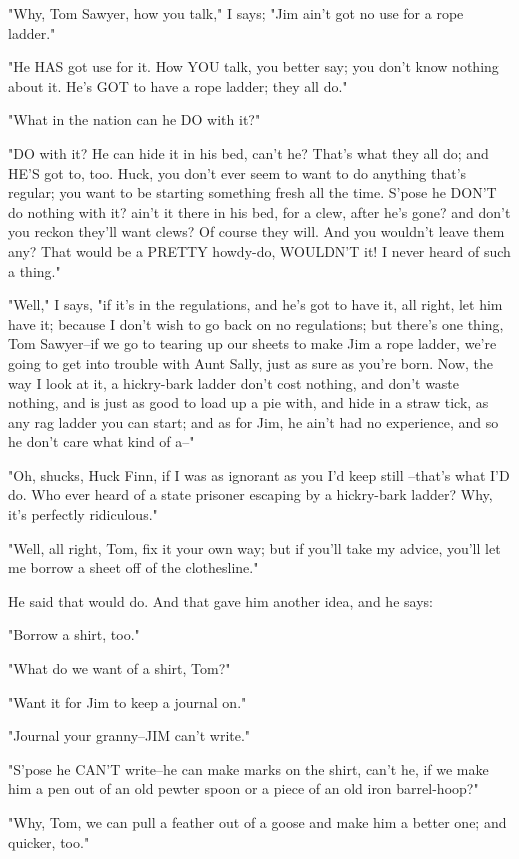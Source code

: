 "Why, Tom Sawyer, how you talk," I says; "Jim ain't got no use for a rope
ladder."

"He HAS got use for it.  How YOU talk, you better say; you don't know
nothing about it.  He's GOT to have a rope ladder; they all do."

"What in the nation can he DO with it?"

"DO with it?  He can hide it in his bed, can't he?  That's what they all
do; and HE'S got to, too.  Huck, you don't ever seem to want to do
anything that's regular; you want to be starting something fresh all the
time. S'pose he DON'T do nothing with it? ain't it there in his bed, for
a clew, after he's gone? and don't you reckon they'll want clews?  Of
course they will.  And you wouldn't leave them any?  That would be a
PRETTY howdy-do, WOULDN'T it!  I never heard of such a thing."

"Well," I says, "if it's in the regulations, and he's got to have it, all
right, let him have it; because I don't wish to go back on no
regulations; but there's one thing, Tom Sawyer--if we go to tearing up
our sheets to make Jim a rope ladder, we're going to get into trouble
with Aunt Sally, just as sure as you're born.  Now, the way I look at it,
a hickry-bark ladder don't cost nothing, and don't waste nothing, and is
just as good to load up a pie with, and hide in a straw tick, as any rag
ladder you can start; and as for Jim, he ain't had no experience, and so
he don't care what kind of a--"

"Oh, shucks, Huck Finn, if I was as ignorant as you I'd keep still
--that's what I'D do.  Who ever heard of a state prisoner escaping by a
hickry-bark ladder?  Why, it's perfectly ridiculous."

"Well, all right, Tom, fix it your own way; but if you'll take my advice,
you'll let me borrow a sheet off of the clothesline."

He said that would do.  And that gave him another idea, and he says:

"Borrow a shirt, too."

"What do we want of a shirt, Tom?"

"Want it for Jim to keep a journal on."

"Journal your granny--JIM can't write."

"S'pose he CAN'T write--he can make marks on the shirt, can't he, if we
make him a pen out of an old pewter spoon or a piece of an old iron
barrel-hoop?"

"Why, Tom, we can pull a feather out of a goose and make him a better
one; and quicker, too."

